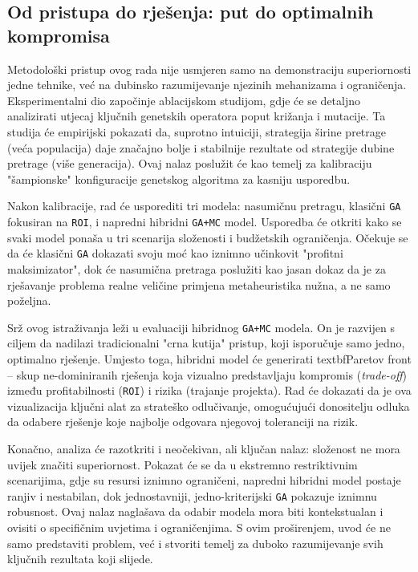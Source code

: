 \subsection{Od pristupa do rješenja: put do optimalnih kompromisa}

Metodološki pristup ovog rada nije usmjeren samo na demonstraciju superiornosti jedne tehnike, već na dubinsko razumijevanje njezinih mehanizama i ograničenja. Eksperimentalni dio započinje ablacijskom studijom, gdje će se detaljno analizirati utjecaj ključnih genetskih operatora poput križanja i mutacije. Ta studija će empirijski pokazati da, suprotno intuiciji, strategija širine pretrage (veća populacija) daje značajno bolje i stabilnije rezultate od strategije dubine pretrage (više generacija). Ovaj nalaz poslužit će kao temelj za kalibraciju "šampionske" konfiguracije genetskog algoritma za kasniju usporedbu.

Nakon kalibracije, rad će usporediti tri modela: nasumičnu pretragu, klasični \texttt{GA} fokusiran na \texttt{ROI}, i napredni hibridni \texttt{GA+MC} model. Usporedba će otkriti kako se svaki model ponaša u tri scenarija složenosti i budžetskih ograničenja. Očekuje se da će klasični \texttt{GA} dokazati svoju moć kao iznimno učinkovit "profitni maksimizator", dok će nasumična pretraga poslužiti kao jasan dokaz da je za rješavanje problema realne veličine primjena metaheuristika nužna, a ne samo poželjna.

Srž ovog istraživanja leži u evaluaciji hibridnog \texttt{GA+MC} modela. On je razvijen s ciljem da nadilazi tradicionalni "crna kutija" pristup, koji isporučuje samo jedno, optimalno rješenje. Umjesto toga, hibridni model će generirati textbf{Paretov front} – skup ne-dominiranih rješenja koja vizualno predstavljaju kompromis (\textit{trade-off}) između profitabilnosti (\texttt{ROI}) i rizika (trajanje projekta). Rad će dokazati da je ova vizualizacija ključni alat za strateško odlučivanje, omogućujući donositelju odluka da odabere rješenje koje najbolje odgovara njegovoj toleranciji na rizik.

Konačno, analiza će razotkriti i neočekivan, ali ključan nalaz: složenost ne mora uvijek značiti superiornost. Pokazat će se da u ekstremno restriktivnim scenarijima, gdje su resursi iznimno ograničeni, napredni hibridni model postaje ranjiv i nestabilan, dok jednostavniji, jedno-kriterijski \texttt{GA} pokazuje iznimnu robusnost. Ovaj nalaz naglašava da odabir modela mora biti kontekstualan i ovisiti o specifičnim uvjetima i ograničenjima. S ovim proširenjem, uvod će ne samo predstaviti problem, već i stvoriti temelj za duboko razumijevanje svih ključnih rezultata koji slijede.

